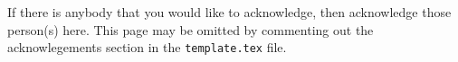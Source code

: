 
\bigskip

\noindent If there is anybody that you would like to acknowledge, then acknowledge
those person(s) here.  This page may be omitted by commenting out the acknowlegements
section in the \texttt{template.tex} file.